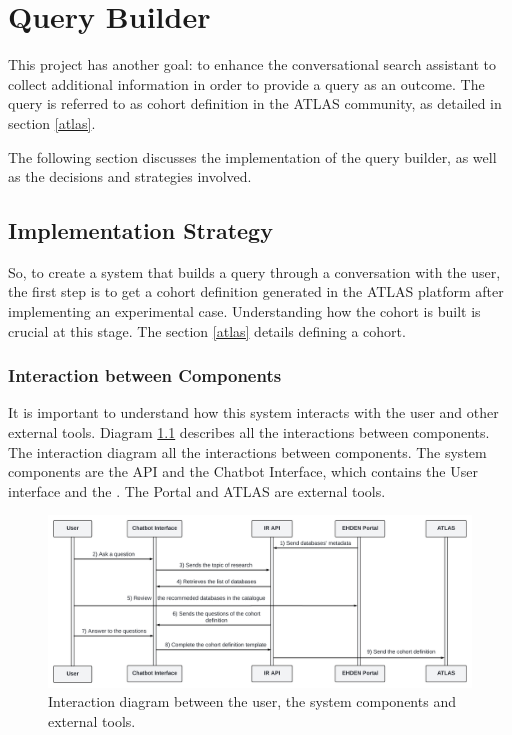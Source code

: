 \chapter{Query Builder}
\label{chapter:QueryBuilder}

This project has another goal: to enhance the conversational search assistant to collect additional information in order to provide a query as an outcome. The query is referred to as cohort definition in the ATLAS community, as detailed in section \ref{atlas}.

The following section discusses the implementation of the query builder, as well as the decisions and strategies involved.


\section{Implementation Strategy}


So, to create a system that builds a query through a conversation with the user, the first step is to get a cohort definition generated in the ATLAS platform after implementing an experimental case. Understanding how the cohort is built is crucial at this stage. The section \ref{atlas} details defining a cohort.


\subsection{Interaction between Components}

It is important to understand how this system interacts with the user and other external tools. Diagram \ref{fig_interaction} describes all the interactions between components. The interaction diagram all the interactions between components. The system components are the {\ir} API and the Chatbot Interface, which contains the User interface and the {\llm}. The {\ehden} Portal and ATLAS are external tools.

\begin{figure}[H]
  \includegraphics[width=\textwidth]{figs/chapter4/interaction_diagram.png}
  \centering
  \caption{Interaction diagram between the user, the system components and external tools.}
  \label{fig_interaction}
\end{figure}

